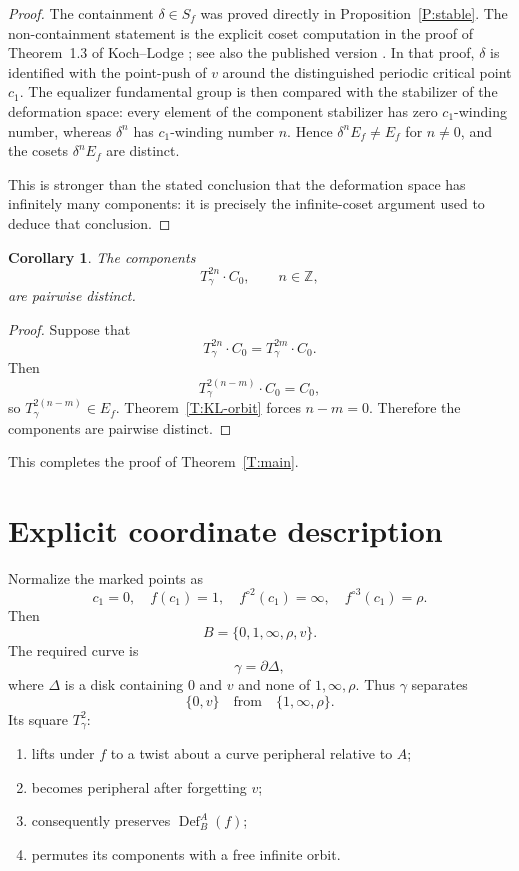 \documentclass[11pt]{article}
\newtheorem{corollary}[theorem]{Corollary}
\theoremstyle{definition}
\theoremstyle{remark}
\newcommand{\Def}{\operatorname{Def}}
\begin{document}
\begin{proof}
The containment \(\delta\in S_f\) was proved directly in
Proposition~\ref{P:stable}.  The non-containment statement is the explicit
coset computation in the proof of Theorem~1.3 of Koch--Lodge
\cite{KL-arxiv}; see also the published version \cite{KL-published}.
In that proof, \(\delta\) is identified with the point-push of \(v\) around
the distinguished periodic critical point \(c_1\).  The equalizer fundamental
group is then compared with the stabilizer of the deformation space: every
element of the component stabilizer has zero \(c_1\)-winding number, whereas
\(\delta^n\) has \(c_1\)-winding number \(n\).  Hence
\(\delta^nE_f\neq E_f\) for \(n\neq0\), and the cosets
\(\delta^nE_f\) are distinct.

This is stronger than the stated conclusion that the deformation space has
infinitely many components: it is precisely the infinite-coset argument used
to deduce that conclusion.
\end{proof}

\begin{corollary}\label{C:free-orbit}
The components
\[
T_\gamma^{2n}\cdot C_0,\qquad n\in\mathbb Z,
\]
are pairwise distinct.
\end{corollary}

\begin{proof}
Suppose that
\[
T_\gamma^{2n}\cdot C_0=T_\gamma^{2m}\cdot C_0.
\]
Then
\[
T_\gamma^{2(n-m)}\cdot C_0=C_0,
\]
so \(T_\gamma^{2(n-m)}\in E_f\).  Theorem~\ref{T:KL-orbit} forces
\(n-m=0\).  Therefore the components are pairwise distinct.
\end{proof}

This completes the proof of Theorem~\ref{T:main}.

\section{Explicit coordinate description}

Normalize the marked points as
\[
c_1=0,\quad f(c_1)=1,\quad f^{\circ2}(c_1)=\infty,
\quad f^{\circ3}(c_1)=\rho.
\]
Then
\[
B=\{0,1,\infty,\rho,v\}.
\]
The required curve is
\[
\gamma=\partial\Delta,
\]
where \(\Delta\) is a disk containing \(0\) and \(v\) and none of
\(1,\infty,\rho\).  Thus \(\gamma\) separates
\[
\{0,v\}
\quad\text{from}\quad
\{1,\infty,\rho\}.
\]
Its square \(T_\gamma^2\):
\begin{enumerate}
\item lifts under \(f\) to a twist about a curve peripheral relative to \(A\);
\item becomes peripheral after forgetting \(v\);
\item consequently preserves \(\Def_B^A(f)\);
\item permutes its components with a free infinite orbit.
\end{enumerate}
\end{document}
